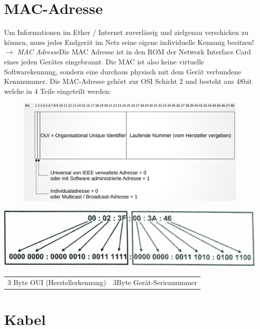 \documentclass[12pt,a4paper]{article}
\begin{document}
	\section{MAC-Adresse}
	Um Informationen im Ether / Internet zuverlässig und zielgenau verschicken zu können, muss jedes Endgerät im Netz seine eigene individuelle Kennung besitzen!\newline $\longrightarrow$ \emph{MAC Adresse}\newline Die MAC Adresse ist in den ROM der Network Interface Card eines jeden Gerätes eingebrannt. Die MAC ist also keine virtuelle Softwarekennung, sondern eine durchaus physisch mit dem Gerät verbundene Kennnummer. Die MAC-Adresse gehört zur OSI Schicht 2 und besteht aus 48bit welche in 4 Teile eingeteilt werden:
	\begin{center}
		\begin{figure}
			\includegraphics[width=\textwidth]{Bilder/MAC-Adresse.PNG}
		\end{figure}
	\end{center}
	\begin{center}
		\includegraphics[scale=1]{Bilder/MAC.png}
		\begin{tabularx}{14cm}{XX}
			3 Byte OUI (Herstellerkennung)&3Byte Gerät-Seriennummer
		\end{tabularx}
	\end{center}

	\section{Kabel}
\end{document}
